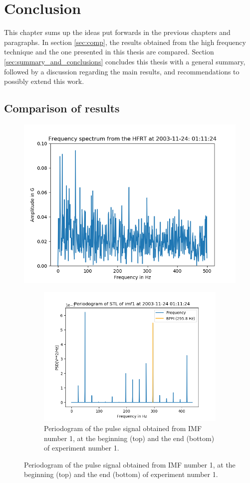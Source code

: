 \documentclass[../Main/thesis.tex]{subfiles}
\begin{document}
	\chapter[Conclusions]{Conclusion}
	\label{sec:conclusions}
	 This chapter sums up the ideas put forwards in the previous chapters and paragraphs. In section \ref{sec:comp}, the results obtained from the high frequency technique and the one presented in this thesis are compared.
	 Section \ref{sec:summary_and_conclusions} concludes this thesis with a general summary, followed by a discussion regarding the main results, and recommendations to possibly extend this work.

	
	\section{Comparison of results}
	\begin{figure}[H]
		\centering
		\includegraphics[width=0.7\linewidth]{../fig/hfrt}
		\caption{Frequency spectrum with the presence of inner race defect frequency and sidebands.}
		\label{fig:bpfi1}
		
		\begin{figure}[H]
			\centering
			\includegraphics[width=0.7\linewidth]{../fig/periodogram_bpfi/end_imf1_bpfi}
			\caption{Periodogram of the pulse signal obtained from IMF number 1, at the beginning (top) and the end (bottom) of experiment number 1.}
			\label{fig:startimf1bpfi1}
		\end{figure}
	\end{figure}
	\label{sec:comp}
\end{document}
